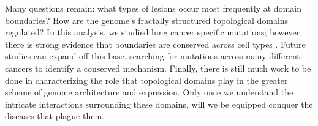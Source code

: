 Many questions remain: what types of lesions occur most frequently at domain boundaries?  How are the genome's fractally structured topological
domains regulated?  In this analysis, we studied lung cancer specific mutations; however, there is strong evidence that boundaries are conserved
across cell types \citep{dixon2012,pope2014}.  Future studies can expand off this base, searching for mutations across many different cancers to
identify a conserved mechanism.  Finally, there is still much work to be done in characterizing the role that topological domains play in the
greater scheme of genome architecture and expression.  Only once we understand the intricate interactions surrounding these domains, will we be
equipped conquer the diseases that plague them.

